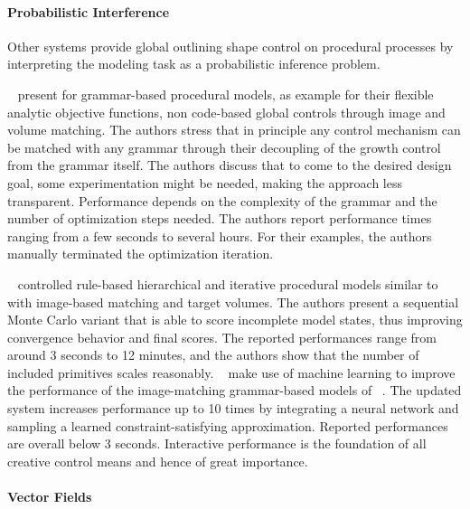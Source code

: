 \paragraph*{Probabilistic Interference}
\label{para:analysis_rulebased_shapes_probabilistic}

Other systems provide global outlining shape control on procedural processes by interpreting the modeling task as a probabilistic inference problem.

\citeauthor*{talton_2011_mpm}~\cite{talton_2011_mpm} present for grammar-based procedural models, as example for their flexible analytic objective functions, non code-based global controls through image and volume matching. The authors stress that in principle any control mechanism can be matched with any grammar through their decoupling of the growth control from the grammar itself. The authors discuss that to come to the desired design goal, some experimentation might be needed, making the approach less transparent. Performance depends on the complexity of the grammar and the number of optimization steps needed. The authors report performance times ranging from a few seconds to several hours. For their examples, the authors manually terminated the optimization iteration.

\citeauthor*{ritchie_2015_cpm}~\cite{ritchie_2015_cpm} controlled rule-based hierarchical and iterative procedural models similar to \citeauthor*{talton_2011_mpm}~\cite{talton_2011_mpm} with image-based matching and target volumes. The authors present a sequential Monte Carlo variant that is able to score incomplete model states, thus improving convergence behavior and final scores. The reported performances range from around 3 seconds to 12 minutes, and the authors show that the number of included primitives scales reasonably. \citeauthor*{ritchie_2016_ngp}~\cite{ritchie_2016_ngp} make use of machine learning to improve the performance of the image-matching grammar-based models of \citeauthor*{ritchie_2015_cpm}~\cite{ritchie_2015_cpm}. The updated system increases performance up to 10 times by integrating a neural network and sampling a learned constraint-satisfying approximation. Reported performances are overall below 3 seconds. Interactive performance is the foundation of all creative control means and hence of great importance.

\paragraph*{Vector Fields}
\label{para:analysis_rulebased_vector_fields}

